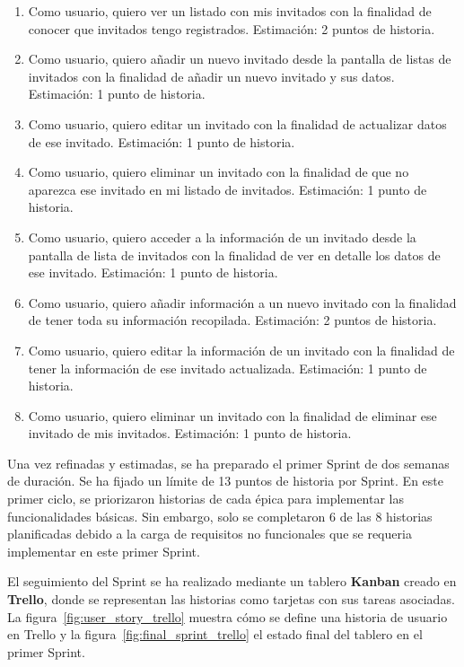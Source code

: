 \begin{enumerate}
  \item Como usuario, quiero ver un listado con mis invitados con la finalidad de conocer que invitados tengo registrados. Estimación: 2 puntos de historia.
  \item Como usuario, quiero añadir un nuevo invitado desde la pantalla de listas de invitados con la finalidad de añadir un nuevo invitado y sus datos. Estimación: 1 punto de historia.
  \item Como usuario, quiero editar un invitado con la finalidad de actualizar datos de ese invitado. Estimación: 1 punto de historia.
  \item Como usuario, quiero eliminar un invitado con la finalidad de que no aparezca ese invitado en mi listado de invitados. Estimación: 1 punto de historia.
  \item Como usuario, quiero acceder a la información de un invitado desde la pantalla de lista de invitados con la finalidad de ver en detalle los datos de ese invitado. Estimación: 1 punto de historia.
  \item Como usuario, quiero añadir información a un nuevo invitado con la finalidad de tener toda su información recopilada. Estimación: 2 puntos de historia.
  \item Como usuario, quiero editar la información de un invitado con la finalidad de tener la información de ese invitado actualizada. Estimación: 1 punto de historia.
  \item Como usuario, quiero eliminar un invitado con la finalidad de eliminar ese invitado de mis invitados. Estimación: 1 punto de historia.
\end{enumerate}

Una vez refinadas y estimadas, se ha preparado el primer Sprint de dos semanas de duraci\'on. Se ha fijado un l\'imite de 13 puntos de historia por Sprint. En este primer ciclo, se priorizaron historias de cada \'epica para implementar las funcionalidades b\'asicas. Sin embargo, solo se completaron 6 de las 8 historias planificadas debido a la carga de requisitos no funcionales que se requeria implementar en este primer Sprint.

El seguimiento del Sprint se ha realizado mediante un tablero \textbf{Kanban} creado en \textbf{Trello}, donde se representan las historias como tarjetas con sus tareas asociadas. La figura~\ref{fig:user_story_trello} muestra cómo se define una historia de usuario en Trello y la figura~\ref{fig:final_sprint_trello} el estado final del tablero en el primer Sprint.

